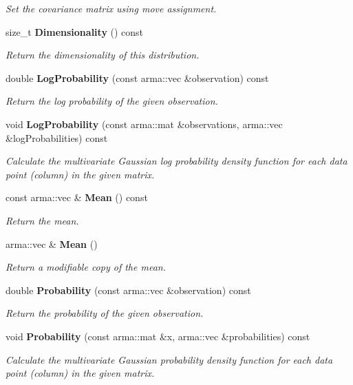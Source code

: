 \begin{DoxyCompactItemize}
\begin{DoxyCompactList}\small\item\em Set the covariance matrix using move assignment. \end{DoxyCompactList}\item 
size\+\_\+t \textbf{ Dimensionality} () const
\begin{DoxyCompactList}\small\item\em Return the dimensionality of this distribution. \end{DoxyCompactList}\item 
double \textbf{ Log\+Probability} (const arma\+::vec \&observation) const
\begin{DoxyCompactList}\small\item\em Return the log probability of the given observation. \end{DoxyCompactList}\item 
void \textbf{ Log\+Probability} (const arma\+::mat \&observations, arma\+::vec \&log\+Probabilities) const
\begin{DoxyCompactList}\small\item\em Calculate the multivariate Gaussian log probability density function for each data point (column) in the given matrix. \end{DoxyCompactList}\item 
const arma\+::vec \& \textbf{ Mean} () const
\begin{DoxyCompactList}\small\item\em Return the mean. \end{DoxyCompactList}\item 
arma\+::vec \& \textbf{ Mean} ()
\begin{DoxyCompactList}\small\item\em Return a modifiable copy of the mean. \end{DoxyCompactList}\item 
double \textbf{ Probability} (const arma\+::vec \&observation) const
\begin{DoxyCompactList}\small\item\em Return the probability of the given observation. \end{DoxyCompactList}\item 
void \textbf{ Probability} (const arma\+::mat \&x, arma\+::vec \&probabilities) const
\begin{DoxyCompactList}\small\item\em Calculate the multivariate Gaussian probability density function for each data point (column) in the given matrix. \end{DoxyCompactList}\item 

\end{DoxyCompactItemize}
